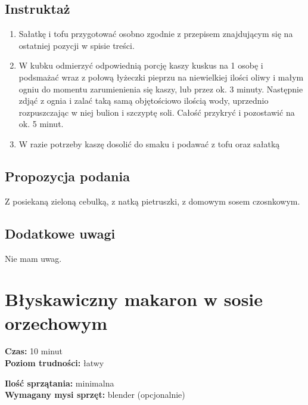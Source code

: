 \documentclass[a4paper,10pt]{book}
\begin{document}
\vspace{0.5cm} 

\subsection*{Instruktaż}
\begin{enumerate}
    \item Sałatkę i tofu przygotować osobno zgodnie z przepisem znajdującym się na ostatniej pozycji w spisie treści.
    \item W kubku odmierzyć odpowiednią porcję kaszy kuskus na 1 osobę i podsmażać wraz z połową łyżeczki pieprzu na niewielkiej ilości oliwy i małym ogniu do momentu zarumienienia się kaszy, lub przez ok. 3 minuty. Następnie zdjąć z ognia i zalać taką samą objętościowo ilością wody, uprzednio rozpuszczając w niej bulion i szczyptę soli. Całość przykryć i pozostawić na ok. 5 minut. 
    \item W razie potrzeby kaszę dosolić do smaku i podawać z tofu oraz sałatką
\end{enumerate}

\vspace{0.5cm} 

\small
\subsection*{Propozycja podania}
Z posiekaną zieloną cebulką, z natką pietruszki, z domowym sosem czosnkowym.

\vspace{0.3cm}

\subsection*{Dodatkowe uwagi}
Nie mam uwag.

\newpage 

\section{Błyskawiczny makaron w sosie orzechowym}
\bigskip
\small
\begin{minipage}{0.45\textwidth}
    \noindent \textbf{Czas:} 10 minut \\
    \textbf{Poziom trudności:} łatwy
\end{minipage}
\begin{minipage}{0.45\textwidth}
    \noindent \textbf{Ilość sprzątania:} minimalna\\
    \textbf{Wymagany mysi sprzęt:} blender (opcjonalnie)
\end{minipage}
\normalsize
\vspace{0.5cm}
\end{document}
